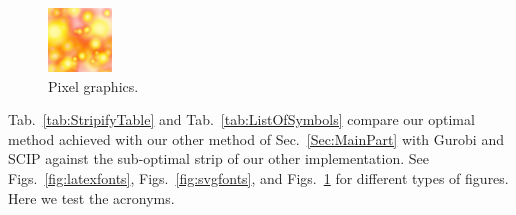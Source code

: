 \begin{figure}
    \centering
    \includegraphics[width=\columnwidth]{imgs/img.png}
    \caption{Pixel graphics.}\label{fig:pixel}
\end{figure}

Tab.~\ref{tab:StripifyTable} and Tab.~\ref{tab:ListOfSymbols} compare our optimal 
method achieved with our other method
of Sec.~\ref{Sec:MainPart} with Gurobi and SCIP against the sub-optimal strip of our 
other implementation.
See Figs.~\ref{fig:latexfonts}, Figs.~\ref{fig:svgfonts}, and Figs.~\ref{fig:pixel} for different types of figures.
Here we test the acronyms.


